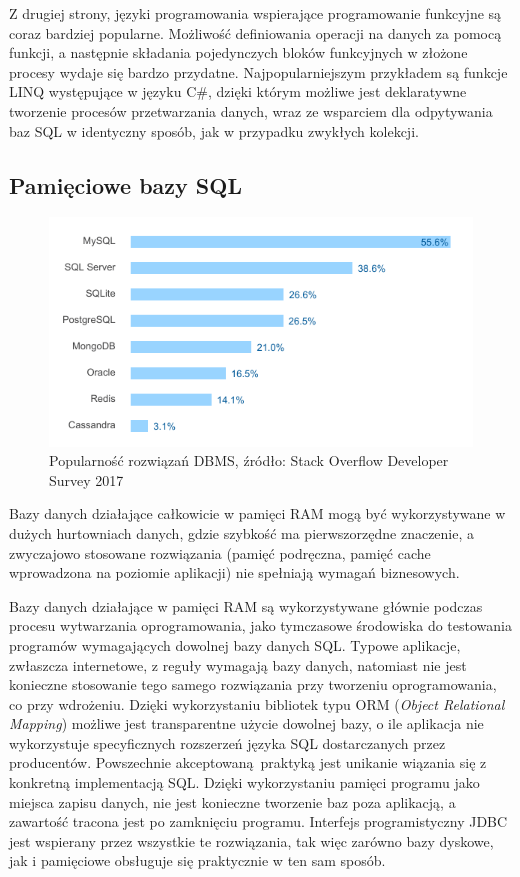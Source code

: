 \documentclass[12pt,twoside,openright]{extarticle}
\begin{document}
    Z drugiej strony, języki programowania wspierające programowanie funkcyjne są coraz bardziej popularne. Możliwość definiowania operacji na danych za pomocą funkcji, a następnie składania pojedynczych bloków funkcyjnych w złożone procesy wydaje się bardzo przydatne. Najpopularniejszym przykładem są funkcje LINQ występujące w języku C\#, dzięki którym możliwe jest deklaratywne tworzenie procesów przetwarzania danych, wraz ze wsparciem dla odpytywania baz SQL w identyczny sposób, jak w przypadku zwykłych kolekcji.


\subsection{Pamięciowe bazy SQL}


\begin{figure}
\centering
\includegraphics{dbstats.png}
\caption{Popularność rozwiązań DBMS, źródło: Stack Overflow Developer Survey 2017}
\label{fig:dbstats}
\end{figure}

    Bazy danych działające całkowicie w pamięci RAM mogą być wykorzystywane w dużych hurtowniach danych, gdzie szybkość ma pierwszorzędne znaczenie, a zwyczajowo stosowane rozwiązania (pamięć podręczna, pamięć cache wprowadzona na poziomie aplikacji) nie spełniają wymagań biznesowych.

      Bazy danych działające w pamięci RAM są wykorzystywane głównie podczas procesu wytwarzania oprogramowania, jako tymczasowe środowiska do testowania programów wymagających dowolnej bazy danych SQL. Typowe aplikacje, zwłaszcza internetowe, z reguły wymagają bazy danych, natomiast nie jest konieczne stosowanie tego samego rozwiązania przy tworzeniu oprogramowania, co przy wdrożeniu. Dzięki wykorzystaniu bibliotek typu ORM (\textit{Object Relational Mapping}) możliwe jest transparentne użycie dowolnej bazy, o ile aplikacja nie wykorzystuje specyficznych rozszerzeń języka SQL dostarczanych przez producentów. Powszechnie akceptowaną praktyką jest unikanie wiązania się z konkretną implementacją SQL. Dzięki wykorzystaniu pamięci programu jako miejsca zapisu danych, nie jest konieczne tworzenie baz poza aplikacją, a zawartość tracona jest po zamknięciu programu. Interfejs programistyczny JDBC jest wspierany przez wszystkie te rozwiązania, tak więc zarówno bazy dyskowe, jak i pamięciowe obsługuje się praktycznie w ten sam sposób. 
\end{document}

